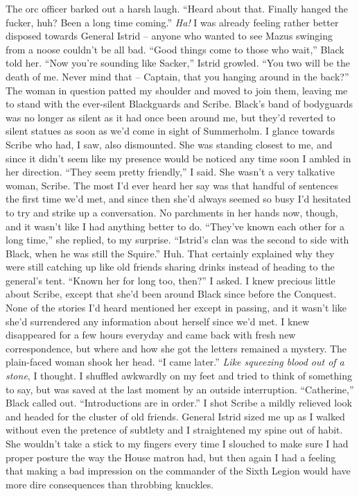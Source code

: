 \documentclass[12pt, openany]{book}
\begin{document}
The orc officer barked out a harsh laugh. “Heard about that. Finally hanged the fucker, huh? Been a long time coming.”
\textit{Ha!} I was already feeling rather better disposed towards General Istrid – anyone who wanted to see Mazus swinging from a noose couldn’t be all bad.
“Good things come to those who wait,” Black told her.
“Now you’re sounding like Sacker,” Istrid growled. “You two will be the death of me. Never mind that – Captain, that you hanging around in the back?”
The woman in question patted my shoulder and moved to join them, leaving me to stand with the ever-silent Blackguards and Scribe. Black’s band of bodyguards was no longer as silent as it had once been around me, but they’d reverted to silent statues as soon as we’d come in sight of Summerholm. I glance towards Scribe who had, I saw, also dismounted. She was standing closest to me, and since it didn’t seem like my presence would be noticed any time soon I ambled in her direction.
“They seem pretty friendly,” I said.
She wasn’t a very talkative woman, Scribe. The most I’d ever heard her say was that handful of sentences the first time we’d met, and since then she’d always seemed so busy I’d hesitated to try and strike up a conversation. No parchments in her hands now, though, and it wasn’t like I had anything better to do.
“They’ve known each other for a long time,” she replied, to my surprise. “Istrid’s clan was the second to side with Black, when he was still the Squire.”
Huh. That certainly explained why they were still catching up like old friends sharing drinks instead of heading to the general’s tent.
“Known her for long too, then?” I asked.
I knew precious little about Scribe, except that she’d been around Black since before the Conquest. None of the stories I’d heard mentioned her except in passing, and it wasn’t like she’d surrendered any information about herself since we’d met. I knew disappeared for a few hours everyday and came back with fresh new correspondence, but where and how she got the letters remained a mystery. The plain-faced woman shook her head. “I came later.”
\textit{Like squeezing blood out of a stone}, I thought. I shuffled awkwardly on my feet and tried to think of something to say, but was saved at the last moment by an outside interruption.
“Catherine,” Black called out. “Introductions are in order.”
I shot Scribe a mildly relieved look and headed for the cluster of old friends. General Istrid sized me up as I walked without even the pretence of subtlety and I straightened my spine out of habit. She wouldn’t take a stick to my fingers every time I slouched to make sure I had proper posture the way the House matron had, but then again I had a feeling that making a bad impression on the commander of the Sixth Legion would have more dire consequences than throbbing knuckles.
\end{document}
